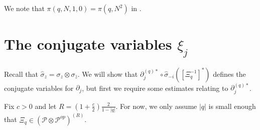\begin{rem}
We note that $\pi(q,N,1,0)=\pi(q,N^2)$ in \cite{D}.
\end{rem}



\section{The conjugate variables $\xi_j$}

Recall that $\hat{\sigma}_z=\sigma_z\otimes \sigma_{\bar{z}}$. We will show that $\partial_j^{(q)*}\circ\hat{\sigma}_{-i}\left(\left[\Xi_q^{-1}\right]^*\right)$ defines the conjugate variables for $\partial_j$, but first we require some estimates relating to $\partial_j^{(q)*}$.\par
Fix $c>0$ and let $R=\left(1+\frac{c}{2}\right)\frac{2}{1-|q|}$. For now, we only assume $|q|$ is small enough that $\Xi_q\in \left(\mathscr{P}\otimes\mathscr{P}^{op}\right)^{(R)}$.

